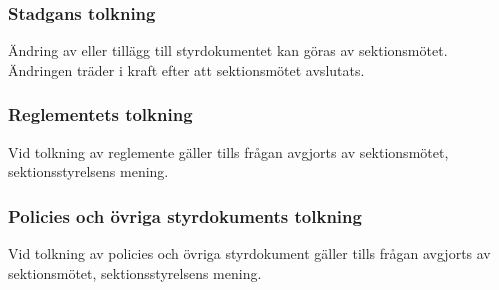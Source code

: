 \subsubsection{Stadgans tolkning}
Ändring av eller tillägg till styrdokumentet kan göras av sektionsmötet. Ändringen träder i kraft efter att sektionsmötet avslutats.

\subsubsection{Reglementets tolkning}
Vid tolkning av reglemente gäller tills frågan avgjorts av sektionsmötet,
sektionsstyrelsens mening.

\subsubsection{Policies och övriga styrdokuments tolkning}
Vid tolkning av policies och övriga styrdokument gäller tills frågan avgjorts av sektionsmötet, sektionsstyrelsens mening.
